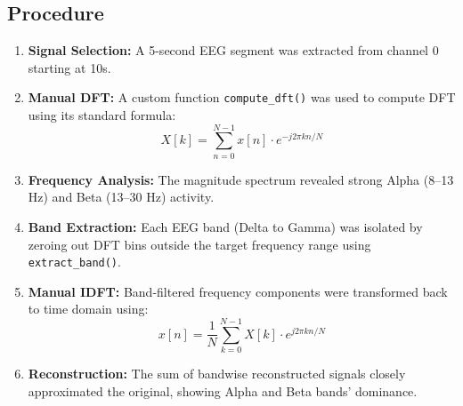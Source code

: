 \documentclass[12pt, a4paper]{article}
\begin{document}
\subsection{Procedure}
\begin{enumerate}
    \item \textbf{Signal Selection:} A 5-second EEG segment was extracted from channel 0 starting at 10s.
    
    \item \textbf{Manual DFT:} A custom function \texttt{compute\_dft()} was used to compute DFT using its standard formula:
    \[
    X[k] = \sum_{n=0}^{N-1} x[n] \cdot e^{-j 2\pi kn/N}
    \]
    
    \item \textbf{Frequency Analysis:} The magnitude spectrum revealed strong Alpha (8–13 Hz) and Beta (13–30 Hz) activity.

    \item \textbf{Band Extraction:} Each EEG band (Delta to Gamma) was isolated by zeroing out DFT bins outside the target frequency range using \texttt{extract\_band()}.

    \item \textbf{Manual IDFT:} Band-filtered frequency components were transformed back to time domain using:
    \[
    x[n] = \frac{1}{N} \sum_{k=0}^{N-1} X[k] \cdot e^{j 2\pi kn/N}
    \]

    \item \textbf{Reconstruction:} The sum of bandwise reconstructed signals closely approximated the original, showing Alpha and Beta bands' dominance.
\end{enumerate}
\end{document}
